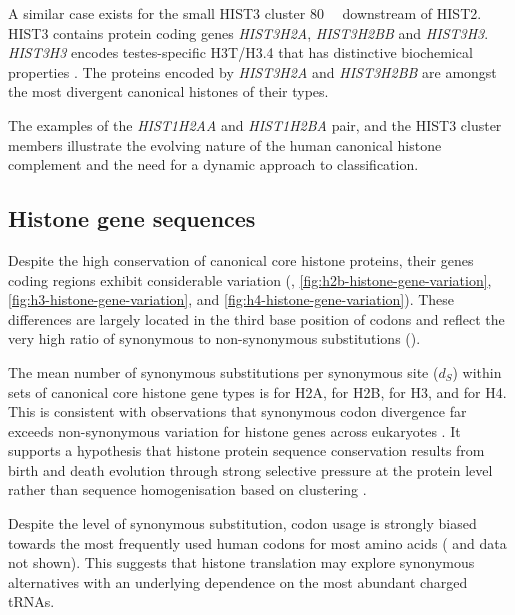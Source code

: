     A similar case exists for the small HIST3 cluster \SI{80}{\mega\bp} downstream of HIST2.
    HIST3 contains protein coding genes \textit{HIST3H2A}, \textit{HIST3H2BB} and \textit{HIST3H3}.
    \textit{HIST3H3} encodes testes-specific H3T/H3.4 
    that has distinctive biochemical properties \citep{WittExpCellRes1996,KurumizakaCOSB2013}.
    The proteins encoded by \textit{HIST3H2A} and \textit{HIST3H2BB}
    are amongst the most divergent canonical histones of their types.

    The examples of the \textit{HIST1H2AA} and \textit{HIST1H2BA} pair, 
    and the HIST3 cluster members illustrate 
    the evolving nature of the human canonical histone complement 
    and the need for a dynamic approach to classification.

  \subsection{Histone gene sequences}
    Despite the high conservation of canonical core histone proteins,
    their genes coding regions exhibit considerable variation
    (, \ref{fig:h2b-histone-gene-variation},
    \ref{fig:h3-histone-gene-variation}, and \ref{fig:h4-histone-gene-variation}).
    These differences are largely located in the third base position of codons
    and reflect the very high ratio of synonymous to non-synonymous
    substitutions ().

    The mean number of synonymous substitutions per synonymous site ($d_S$)
    within sets of canonical core histone gene types is
     \result{} for H2A,
     \result{} for H2B,
     \result{} for H3,
    and  \result{} for H4.
    This is consistent with observations that
    synonymous codon divergence far exceeds non-synonymous variation
    for histone genes across eukaryotes \citep{Piontkivska2002, Rooney2002}.
    It supports a hypothesis that histone protein sequence conservation
    results from birth and death evolution through strong selective pressure
    at the protein level rather than 
    sequence homogenisation based on clustering \citep{NeiRooney2005}.

    Despite the level of synonymous substitution,
    codon usage is strongly biased towards the most frequently used
    human codons for most amino acids ( and data not shown).
    This suggests that histone translation may explore synonymous alternatives
    with an underlying dependence on the most abundant charged tRNAs.

